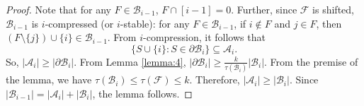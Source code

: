 \documentclass[runningheads,12pt,a4paper]{article}
\begin{document}
\begin{proof}
	Note that for any  $F \in \mathcal{B}_{i-1}$, $F \cap [i-1]=0$.		
	Further, since $\mathcal{F}$ is shifted,  $\mathcal{B}_{i-1}$ is $i$-compressed (or $i$-stable): for any $F \in \mathcal{B}_{i-1}$, if $i \notin F$ and $j \in F$, then $(F \setminus \{j\}) \cup \{i\} \in \mathcal{B}_{i-1}$.
	From $i$-compression, it follows that 
	$$\{ S \cup \{i\} : S \in \partial \mathcal{B}_{i} \} \subseteq \mathcal{A}_i.$$
	So, $|\mathcal{A}_i| \geq  |\partial \mathcal{B}_{i}|.$
	From Lemma \ref{lemma:4}, $|\partial\mathcal{B}_i|\geq \frac{k}{\tau(\mathcal{B}_i)}|\mathcal{B}_i|$. 
	From the premise of the lemma, we have $\tau(\mathcal{B}_i) \leq \tau(\mathcal{F}) \leq k$.
	Therefore, $|\mathcal{A}_i|\geq |\mathcal{B}_i|$. Since $|\mathcal{B}_{i-1}|=|\mathcal{A}_i|+|\mathcal{B}_{i}|$, the lemma follows.
\end{proof}
\end{document}
